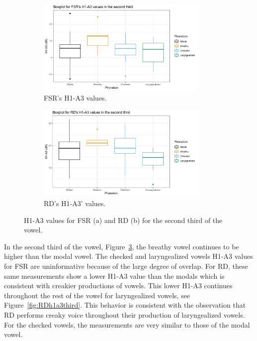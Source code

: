\documentclass[12pt, letterpaper]{article}
\begin{document}
\begin{figure}[!h]
	\centering
	\begin{subfigure}{.5\textwidth}
		\centering
		\includegraphics[width=0.9\textwidth]{../mean_FSR_h1a3_Second.png}
		\caption{FSR's H1-A3 values.}
		\label{fig:FSRh1a3second} 
	\end{subfigure}%
	\begin{subfigure}{.5\textwidth}
		\centering
		\includegraphics[width=0.9\textwidth]{../mean_RD_h1a3_Second.png}
		\caption{RD's H1-A3' values.}
		\label{fig:RDh1a3second} 
	\end{subfigure}
	\caption{H1-A3 values for FSR (a) and RD (b) for the second third of the vowel. }
	\label{fig:h1a3second}
\end{figure}

In the second third of the vowel, Figure~\ref{fig:h1a3second}, the breathy vowel continues to be higher than the modal vowel. The checked and laryngealized vowels H1-A3 values for FSR are uninformative because of the large degree of overlap. For RD, these same measurements show a lower H1-A3 value than the modals which is consistent with creakier productions of vowels. This lower H1-A3 continues throughout the rest of the vowel for laryngealized vowels, see Figure~\ref{fig:RDh1a3third}. This behavior is consistent with the observation that RD performs creaky voice throughout their production of laryngealized vowels. For the checked vowels, the measurements are very similar to those of the modal vowel. 
\end{document}
